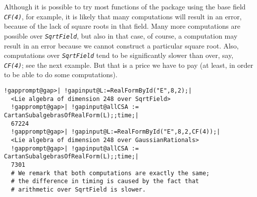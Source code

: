 \documentclass[a4paper,11pt]{report}
\begin{document}
{{ Although it is possible to try most functions of the package using the base
field \mbox{\texttt{\mdseries\slshape CF(4)}}, for example, it is likely that many computations will result in an error,
because of the lack of square roots in that field. Many more computations are
possible over \mbox{\texttt{\mdseries\slshape SqrtField}}, but also in that case, of course, a computation may result in an error
because we cannot construct a particular square root. Also, computations over \mbox{\texttt{\mdseries\slshape SqrtField}} tend to be significantly slower than over, say, \mbox{\texttt{\mdseries\slshape CF(4)}}; see the next example. But that is a price we have to pay (at least, in order
to be able to do some computations). 
\begin{Verbatim}[commandchars=!@|,fontsize=\small,frame=single,label=Example]
  !gapprompt@gap>| !gapinput@L:=RealFormById("E",8,2);|
  <Lie algebra of dimension 248 over SqrtField>
  !gapprompt@gap>| !gapinput@allCSA := CartanSubalgebrasOfRealForm(L);;time;|
  67224
  !gapprompt@gap>| !gapinput@L:=RealFormById("E",8,2,CF(4));|
  <Lie algebra of dimension 248 over GaussianRationals>
  !gapprompt@gap>| !gapinput@allCSA := CartanSubalgebrasOfRealForm(L);;time;|
  7301
  # We remark that both computations are exactly the same; 
  # the difference in timing is caused by the fact that 
  # arithmetic over SqrtField is slower.
\end{Verbatim}
 }

 }

  
\end{document}
